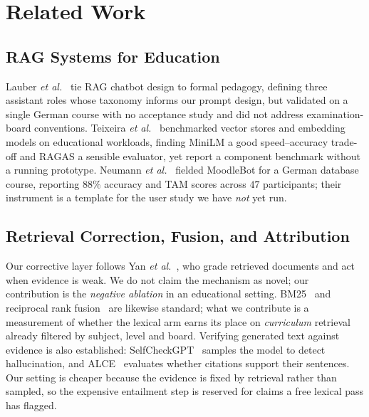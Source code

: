 \documentclass[conference]{IEEEtran}
\begin{document}
\section{Related Work}
\subsection{RAG Systems for Education}
Lauber \textit{et al.}~\cite{lauber2025} tie RAG chatbot design to formal
pedagogy, defining three assistant roles whose taxonomy informs our prompt
design, but validated on a single German course with no acceptance study and
did not address examination-board conventions. Teixeira \textit{et
al.}~\cite{teixeira2025} benchmarked vector stores and embedding models on
educational workloads, finding MiniLM a good speed--accuracy trade-off and
RAGAS a sensible evaluator, yet report a component benchmark without a running
prototype. Neumann \textit{et al.}~\cite{neumann2025} fielded MoodleBot for a
German database course, reporting $88\%$ accuracy and TAM scores across $47$
participants; their instrument is a template for the user study we have
\emph{not} yet run.

\subsection{Retrieval Correction, Fusion, and Attribution}
Our corrective layer follows Yan \textit{et al.}~\cite{yan2024crag}, who grade
retrieved documents and act when evidence is weak. We do not claim the
mechanism as novel; our contribution is the \emph{negative ablation} in an
educational setting. BM25~\cite{robertson2009} and reciprocal rank
fusion~\cite{cormack2009} are likewise standard; what we contribute is a
measurement of whether the lexical arm earns its place on \emph{curriculum}
retrieval already filtered by subject, level and board. Verifying generated
text against evidence is also established: SelfCheckGPT~\cite{manakul2023}
samples the model to detect hallucination, and ALCE~\cite{gao2023} evaluates
whether citations support their sentences. Our setting is cheaper because the
evidence is fixed by retrieval rather than sampled, so the expensive entailment
step is reserved for claims a free lexical pass has flagged.
\end{document}
